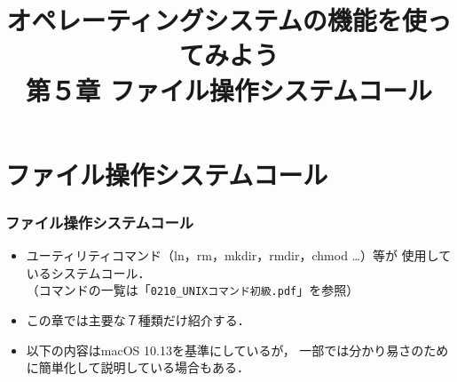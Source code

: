 \documentclass{beamer}                 %
\begin{document}
\title{オペレーティングシステムの機能を使ってみよう\\
第５章 ファイル操作システムコール}
\date{}

\begin{frame}
  \titlepage
\end{frame}


\section{ファイル操作システムコール}
\begin{frame}[fragile]
  \frametitle{ファイル操作システムコール}
  \begin{itemize}
    \item ユーティリティコマンド（ln，rm，mkdir，rmdir，chmod …）等が
      使用しているシステムコール．\\
      （コマンドの一覧は「\texttt{0210\_UNIXコマンド初級.pdf}」を参照）
    \item この章では主要な７種類だけ紹介する．
    \item 以下の内容はmacOS 10.13を基準にしているが，
      一部では分かり易さのために簡単化して説明している場合もある．
  \end{itemize}
\end{frame}
\end{document}
